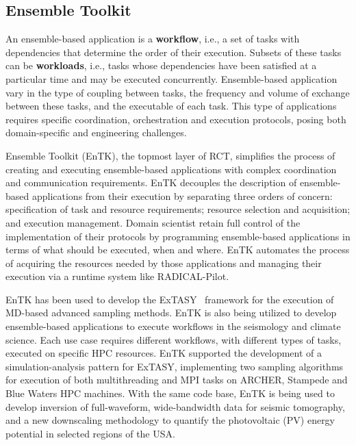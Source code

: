 \subsection{Ensemble Toolkit}

An ensemble-based application is a \textbf{workflow}, i.e., a set of tasks
with dependencies that determine the order of their execution. Subsets of
these tasks can be \textbf{workloads}, i.e., tasks whose dependencies have
been satisfied at a particular time and may be executed concurrently.
Ensemble-based application vary in the type of coupling between tasks, the
frequency and volume of exchange between these tasks, and the executable of
each task. This type of applications requires specific coordination,
orchestration and execution protocols, posing both domain-specific and
engineering challenges.

Ensemble Toolkit (EnTK), the topmost layer of RCT, simplifies the process of
creating and executing ensemble-based applications with complex coordination
and communication requirements. EnTK decouples the description of
ensemble-based applications from their execution by separating three orders
of concern: specification of task and resource requirements; resource
selection and acquisition; and execution management. Domain scientist retain
full control of the implementation of their protocols by programming
ensemble-based applications in terms of what should be executed, when and
where. EnTK automates the process of acquiring the resources needed by those
applications and managing their execution via a runtime system like
RADICAL-Pilot.


EnTK has been used to develop the ExTASY~\cite{balasubramanian2016extasy}
framework for the execution of MD-based advanced sampling methods. EnTK is
also being utilized to develop ensemble-based applications to execute
workflows in the seismology and climate science. Each use case requires
different workflows, with different types of tasks, executed on specific HPC
resources. EnTK supported the development of a simulation-analysis pattern
for ExTASY, implementing two sampling algorithms for execution of both
multithreading and MPI tasks on ARCHER, Stampede and Blue Waters HPC
machines. With the same code base, EnTK is being used to develop inversion of
full-waveform, wide-bandwidth data for seismic tomography, and a new
downscaling methodology to quantify the photovoltaic (PV) energy potential in
selected regions of the USA\@.


